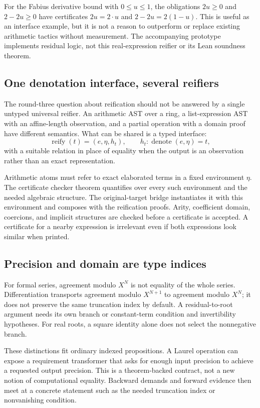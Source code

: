 \documentclass[11pt,a4paper]{article}
\theoremstyle{definition}
\theoremstyle{remark}
\begin{document}
For the Fabius derivative bound with $0\le u\le1$, the obligations $2u\ge0$ and $2-2u\ge0$ have certificates $2u=2\cdot u$ and $2-2u=2(1-u)$. This is useful as an interface example, but it is not a reason to outperform or replace existing arithmetic tactics without measurement. The accompanying prototype implements residual logic, not this real-expression reifier or its Lean soundness theorem.

\subsection{One denotation interface, several reifiers}
The round-three question about reification should not be answered by a single untyped universal reifier. An arithmetic AST over a ring, a list-expression AST with an affine-length observation, and a partial operation with a domain proof have different semantics. What can be shared is a typed interface:
\[
 \operatorname{reify}(t)=(e,\eta,h_t),\qquad
 h_t:\operatorname{denote}(e,\eta)=t,
\]
with a suitable relation in place of equality when the output is an observation rather than an exact representation.

Arithmetic atoms must refer to exact elaborated terms in a fixed environment $\eta$. The certificate checker theorem quantifies over every such environment and the needed algebraic structure. The original-target bridge instantiates it with this environment and composes with the reification proofs. Arity, coefficient domain, coercions, and implicit structures are checked before a certificate is accepted. A certificate for a nearby expression is irrelevant even if both expressions look similar when printed.

\subsection{Precision and domain are type indices}
For formal series, agreement modulo $X^N$ is not equality of the whole series. Differentiation transports agreement modulo $X^{N+1}$ to agreement modulo $X^N$; it does not preserve the same truncation index by default. A residual-to-root argument needs its own branch or constant-term condition and invertibility hypotheses. For real roots, a square identity alone does not select the nonnegative branch.

These distinctions fit ordinary indexed propositions. A Laurel operation can expose a requirement transformer that asks for enough input precision to achieve a requested output precision. This is a theorem-backed contract, not a new notion of computational equality. Backward demands and forward evidence then meet at a concrete statement such as the needed truncation index or nonvanishing condition.
\end{document}
